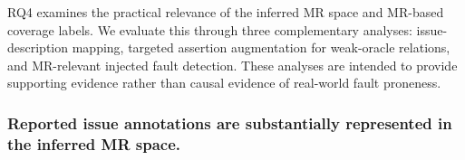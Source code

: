 RQ4 examines the practical relevance of the inferred MR space and MR-based coverage labels. We evaluate this through three complementary analyses: issue-description mapping, targeted assertion augmentation for weak-oracle relations, and MR-relevant injected fault detection. These analyses are intended to provide supporting evidence rather than causal evidence of real-world fault proneness.

\subsubsection{Reported issue annotations are substantially represented in the inferred MR space.}


